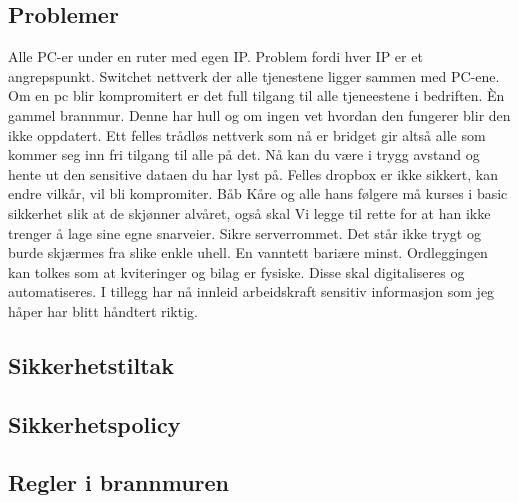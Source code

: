 \documentclass[12pt,a4paper]{article}
\begin{document}
\subsection*{Problemer}
Alle PC-er under en ruter med egen IP. Problem fordi hver IP er et angrepspunkt. Switchet nettverk der alle tjenestene ligger sammen med PC-ene. Om en pc blir kompromitert er det full tilgang til alle tjeneestene i bedriften.
Èn gammel brannmur. Denne har hull og om ingen vet hvordan den fungerer blir den ikke oppdatert. Ett felles trådløs nettverk som nå er bridget gir altså alle som kommer seg inn fri tilgang til alle på det. Nå kan du være i trygg avstand og hente ut den sensitive dataen du har lyst på. Felles dropbox er ikke sikkert, kan endre vilkår, vil bli kompromiter.
Båb Kåre og alle hans følgere må kurses i basic sikkerhet slik at de skjønner alvåret, også skal Vi legge til rette for at han ikke trenger å lage sine egne snarveier. Sikre serverrommet. Det står ikke trygt og burde skjærmes fra slike enkle uhell. En vanntett bariære minst. Ordleggingen kan tolkes som at kviteringer og bilag er fysiske. Disse skal digitaliseres og automatiseres. I tillegg har nå innleid arbeidskraft sensitiv informasjon som jeg håper har blitt håndtert riktig.

\subsection*{Sikkerhetstiltak}


\subsection*{Sikkerhetspolicy}

\subsection*{Regler i brannmuren}
\end{document}
